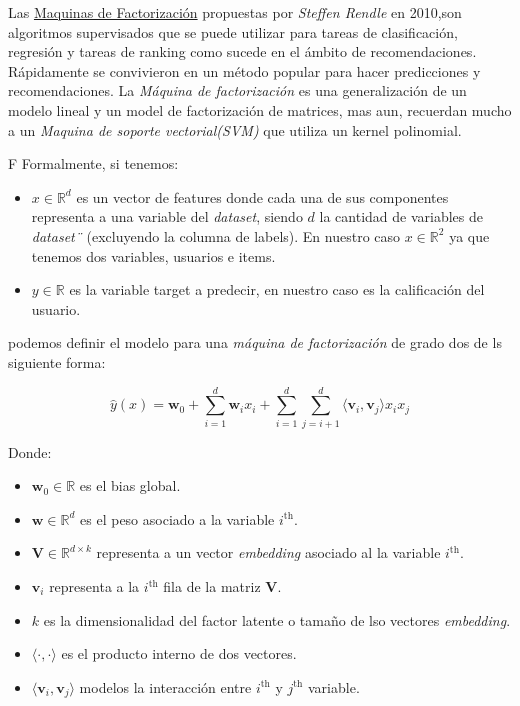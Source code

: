 \documentclass[11pt,a4paper,twoside]{thesis}
\begin{document}
Las \href{https://www.csie.ntu.edu.tw/~b97053/paper/Rendle2010FM.pdf}{Maquinas de Factorización} propuestas por \textit{Steffen Rendle} en 2010,son algoritmos supervisados que se puede utilizar para tareas de clasificación, regresión y tareas de ranking como sucede en el ámbito de recomendaciones. Rápidamente se convivieron en un método popular para hacer predicciones y recomendaciones. La \textit{Máquina de factorización} es una generalización de un modelo lineal y un model de factorización de matrices, mas aun, recuerdan mucho a un \textit{Maquina de soporte vectorial(SVM)} que utiliza un kernel polinomial.

F
Formalmente, si tenemos:

\begin{itemize}
	\item $x\in\mathbb{R}^{d}$ es un vector de features donde cada una de sus componentes representa a una variable del \textit{dataset}, siendo $d$ la cantidad de variables de \textit{dataset¨} (excluyendo la columna de labels). En nuestro caso $x\in\mathbb{R}^{2}$ ya que tenemos dos variables, usuarios e items.
	\item $y\in\mathbb{R}$ es la variable target a predecir, en nuestro caso es la calificación del usuario. 
\end{itemize}

podemos definir el modelo para una \textit{máquina de factorización} de grado dos de ls siguiente forma:

\begin{equation}
\hat{y}(x) = \mathbf{w}_0 + \sum_{i=1}^d \mathbf{w}_i x_i + \sum_{i=1}^d\sum_{j=i+1}^d \langle\mathbf{v}_i, \mathbf{v}_j\rangle x_i x_j
\end{equation}
\begin{description}
	\item[Donde:]
\end{description}
\begin{itemize}
	\item $\mathbf{w}_0 \in \mathbb{R}$ es el bias global.
	\item $\mathbf{w} \in \mathbb{R}^d$ es el peso asociado a la variable $i^\mathrm{th}$.
	\item $\mathbf{V} \in \mathbb{R}^{d\times k}$ representa a un vector \textit{embedding} asociado al la variable $i^\mathrm{th}$.
	\item $\mathbf{v}_i$ representa a la $i^\mathrm{th}$ fila de la matriz $\mathbf{V}$. 
	\item $k$ es la dimensionalidad del factor latente o tamaño de lso vectores \textit{embedding}.
	\item $\langle\cdot, \cdot \rangle$ es el producto interno de dos vectores.
	\item $\langle \mathbf{v}_i, \mathbf{v}_j \rangle$ modelos la interacción entre $i^\mathrm{th}$ y $j^\mathrm{th}$ variable. 
\end{itemize}
\end{document}

